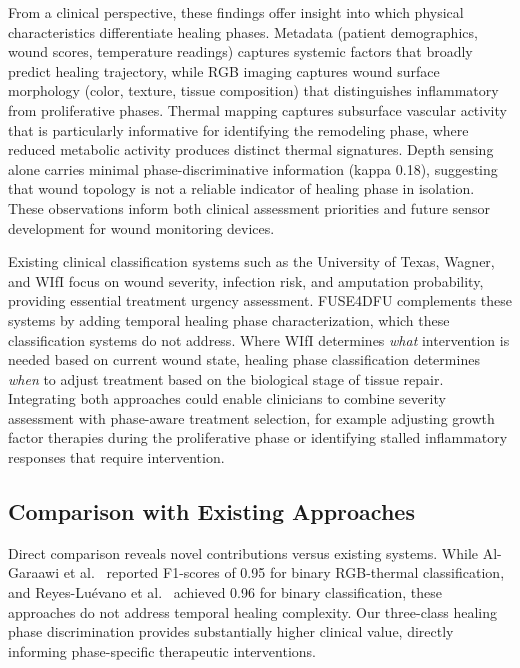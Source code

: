 \documentclass[journal,twoside,web]{ieeecolor}
\begin{document}
From a clinical perspective, these findings offer insight into which physical characteristics differentiate healing phases. Metadata (patient demographics, wound scores, temperature readings) captures systemic factors that broadly predict healing trajectory, while RGB imaging captures wound surface morphology (color, texture, tissue composition) that distinguishes inflammatory from proliferative phases. Thermal mapping captures subsurface vascular activity that is particularly informative for identifying the remodeling phase, where reduced metabolic activity produces distinct thermal signatures. Depth sensing alone carries minimal phase\nobreakdash-discriminative information (kappa 0.18), suggesting that wound topology is not a reliable indicator of healing phase in isolation. These observations inform both clinical assessment priorities and future sensor development for wound monitoring devices.

Existing clinical classification systems such as the University of Texas, Wagner, and WIfI focus on wound severity, infection risk, and amputation probability, providing essential treatment urgency assessment. FUSE4DFU complements these systems by adding temporal healing phase characterization, which these classification systems do not address. Where WIfI determines \textit{what} intervention is needed based on current wound state, healing phase classification determines \textit{when} to adjust treatment based on the biological stage of tissue repair. Integrating both approaches could enable clinicians to combine severity assessment with phase-aware treatment selection, for example adjusting growth factor therapies during the proliferative phase or identifying stalled inflammatory responses that require intervention.

\subsection{Comparison with Existing Approaches}
Direct comparison reveals novel contributions versus existing systems. While Al\nobreakdash-Garaawi et al.~\cite{al2022diabetic} reported F1\nobreakdash-scores of 0.95 for binary RGB\nobreakdash-thermal classification, and Reyes\nobreakdash-Lu\'{e}vano et al.~\cite{reyes2023dfu} achieved 0.96 for binary classification, these approaches do not address temporal healing complexity. Our three\nobreakdash-class healing phase discrimination provides substantially higher clinical value, directly informing phase\nobreakdash-specific therapeutic interventions.
\end{document}
